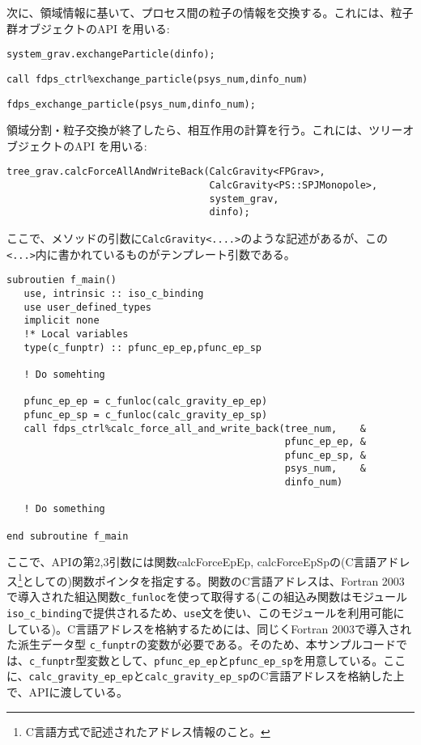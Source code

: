 次に、領域情報に基いて、プロセス間の粒子の情報を交換する。これには、粒子群オブジェクトのAPI \exchangeParticle を用いる:
\ifCpp%
\begin{lstlisting}[caption=粒子交換の実行]
system_grav.exchangeParticle(dinfo);
\end{lstlisting}
\endifCpp
\ifFtn%
\begin{lstlisting}[caption=粒子交換の実行]
call fdps_ctrl%exchange_particle(psys_num,dinfo_num)
\end{lstlisting}
\endifFtn
\ifC%
\begin{lstlisting}[caption=粒子交換の実行]
fdps_exchange_particle(psys_num,dinfo_num);
\end{lstlisting}
\endifC


領域分割・粒子交換が終了したら、相互作用の計算を行う。これには、ツリーオブジェクトのAPI \calcForceAllAndWriteBack を用いる:
\ifCpp%
\begin{lstlisting}[caption=相互作用計算の実行]
tree_grav.calcForceAllAndWriteBack(CalcGravity<FPGrav>,
                                   CalcGravity<PS::SPJMonopole>,
                                   system_grav,
                                   dinfo);
\end{lstlisting}
ここで、メソッドの引数に\texttt{CalcGravity<....>}のような記述があるが、この\texttt{<...>}内に書かれているものがテンプレート引数である。
\endifCpp
\ifFtn%
\begin{lstlisting}[caption=相互作用計算の実行]
subroutien f_main()
   use, intrinsic :: iso_c_binding
   use user_defined_types
   implicit none
   !* Local variables
   type(c_funptr) :: pfunc_ep_ep,pfunc_ep_sp
   
   ! Do somehting
   
   pfunc_ep_ep = c_funloc(calc_gravity_ep_ep)
   pfunc_ep_sp = c_funloc(calc_gravity_ep_sp)
   call fdps_ctrl%calc_force_all_and_write_back(tree_num,    &
                                                pfunc_ep_ep, &
                                                pfunc_ep_sp, &
                                                psys_num,    &
                                                dinfo_num)

   ! Do something

end subroutine f_main
\end{lstlisting}
ここで、APIの第2,3引数には関数calcForceEpEp, calcForceEpSpの(C言語アドレス\footnote{C言語方式で記述されたアドレス情報のこと。}としての)関数ポインタを指定する。関数のC言語アドレスは、Fortran 2003で導入された組込関数\texttt{c\_funloc}を使って取得する(この組込み関数はモジュール\texttt{iso\_c\_binding}で提供されるため、\texttt{use}文を使い、このモジュールを利用可能にしている)。C言語アドレスを格納するためには、同じくFortran 2003で導入された派生データ型 \texttt{c\_funptr}の変数が必要である。そのため、本サンプルコードでは、\texttt{c\_funptr}型変数として、\texttt{pfunc\_ep\_ep}と\texttt{pfunc\_ep\_sp}を用意している。ここに、\texttt{calc\_gravity\_ep\_ep}と\texttt{calc\_gravity\_ep\_sp}のC言語アドレスを格納した上で、APIに渡している。
